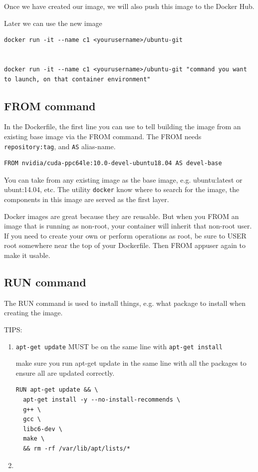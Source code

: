 Once we have created our image, we will also push this image to the Docker Hub.

Later we can use the new image
\begin{verbatim}
docker run -it --name c1 <yourusername>/ubuntu-git


docker run -it --name c1 <yourusername>/ubuntu-git "command you want to launch, on that container environment"
\end{verbatim}


\subsection{FROM command}
\label{sec:Dockerfile-FROM}


In the Dockerfile, the first line you can use to tell building the image from an existing base image
via the FROM command. The FROM needs \verb!repository:tag!, and \verb!AS! alias-name.

\begin{verbatim}
FROM nvidia/cuda-ppc64le:10.0-devel-ubuntu18.04 AS devel-base
\end{verbatim} 


You can take from any existing  image as the base image, e.g. ubuntu:latest or
ubunt:14.04, etc.  The utility \verb!docker! know where to search for the image,
the components in this image are served as the first layer.
  

Docker images are great because they are reusable. But when you FROM an image
that is running as non-root, your container will inherit that non-root user. If
you need to create your own or perform operations as root, be sure to USER root
somewhere near the top of your Dockerfile. Then FROM appuser again to make it
usable.


\subsection{RUN command}
\label{sec:Dockerfile-RUN}

The RUN command is used to install things, e.g. what package to install when
creating the image.

TIPS:
\begin{enumerate}
  \item \verb!apt-get update! MUST be on the same line with \verb!apt-get install!
  
  make sure you run apt-get update in the same line with all the packages to ensure all are updated correctly.
  \begin{verbatim}
RUN apt-get update && \
  apt-get install -y --no-install-recommends \
  g++ \
  gcc \
  libc6-dev \
  make \
  && rm -rf /var/lib/apt/lists/*
  \end{verbatim}
  \item 
\end{enumerate}
  
